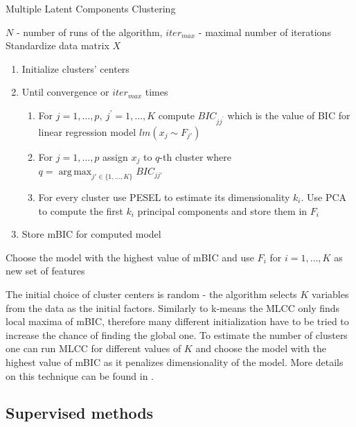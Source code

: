 \documentclass[shortabstract, english, mgr]{iithesis}
\DeclareMathOperator*{\argmax}{arg\,max}
\begin{document}
\begin{algorithm}
\caption{Multiple Latent Components Clustering}
\label{alg:mlcc}          
\begin{algorithmic}                    
    \REQUIRE $N$ - number of runs of the algorithm, $iter_{max}$ - maximal number of iterations
    \STATE Standardize data matrix $X$
        \STATE 
        	\begin{enumerate}
        	\item Initialize clusters' centers
        	\item Until convergence or $iter_{max}$ times
        	\begin{enumerate}
        	\item For $j=1, \ldots, p, \ j^{\prime} = 1, \ldots, K$ compute $BIC_{jj^{\prime}}$ which is the value of BIC for linear regression model $lm(x_j \sim F_{j'})$
        	\item For $j=1, \ldots, p$ assign $x_j$ to $q$-th cluster where $q = \argmax_{j' \in \{1,\ldots, K\}} BIC_{jj'} $
        	\item For every cluster use PESEL to estimate its dimensionality $k_i$. Use PCA to compute the first $k_i$ principal components and store them in $F_i$
        	\end{enumerate}
        	\item Store mBIC for computed model
        	\end{enumerate}
        	\ENDFOR
        \STATE Choose the model with the highest value of mBIC and use $F_i$ for $i=1, \ldots, K$ as new set of features
\end{algorithmic}
\end{algorithm}

The initial choice of cluster centers is random - the algorithm selects $K$ variables from the data as the initial factors. Similarly to k-means the MLCC only finds local maxima of mBIC, therefore many different initialization have to be tried to increase the chance of finding the global one. To estimate the number of clusters one can run MLCC for different values of $K$ and choose the model with the highest value of mBIC as it penalizes dimensionality of the model. More details on this technique can be found in \cite{MLCC}.

\subsection{Supervised methods}
\end{document}
